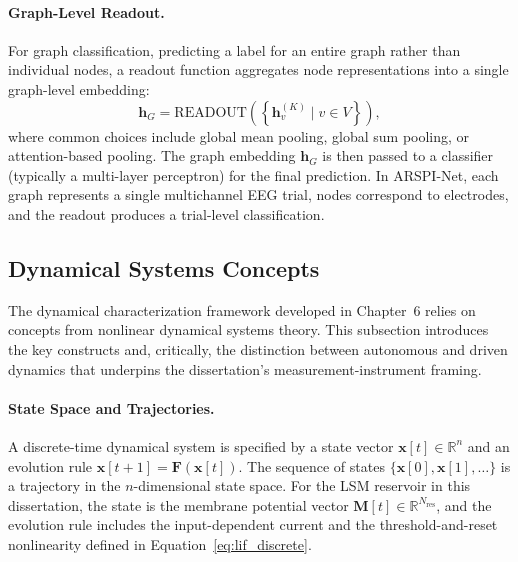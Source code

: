 \paragraph{Graph-Level Readout.}
For graph classification, predicting a label for an entire graph rather than individual nodes, a readout function aggregates node representations into a single graph-level embedding:
\begin{equation}
    \mathbf{h}_G = \text{READOUT}\!\left(\left\{\mathbf{h}_v^{(K)} \mid v \in V\right\}\right),
    \label{eq:readout}
\end{equation}
where common choices include global mean pooling, global sum pooling, or attention-based pooling. The graph embedding $\mathbf{h}_G$ is then passed to a classifier (typically a multi-layer perceptron) for the final prediction. In ARSPI-Net, each graph represents a single multichannel EEG trial, nodes correspond to electrodes, and the readout produces a trial-level classification.

\subsection{Dynamical Systems Concepts}
\label{sec:dynamical_systems}

The dynamical characterization framework developed in Chapter~6 relies on concepts from nonlinear dynamical systems theory. This subsection introduces the key constructs and, critically, the distinction between autonomous and driven dynamics that underpins the dissertation's measurement-instrument framing.

\paragraph{State Space and Trajectories.}
A discrete-time dynamical system is specified by a state vector $\mathbf{x}[t] \in \mathbb{R}^n$ and an evolution rule $\mathbf{x}[t+1] = \mathbf{F}(\mathbf{x}[t])$. The sequence of states $\{\mathbf{x}[0], \mathbf{x}[1], \ldots\}$ is a trajectory in the $n$-dimensional state space. For the LSM reservoir in this dissertation, the state is the membrane potential vector $\mathbf{M}[t] \in \mathbb{R}^{N_{\text{res}}}$, and the evolution rule includes the input-dependent current and the threshold-and-reset nonlinearity defined in Equation~\eqref{eq:lif_discrete}.


